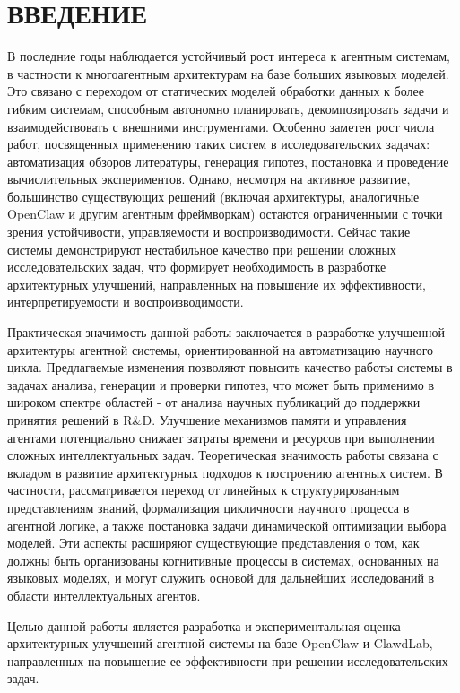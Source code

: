 \chapter*{ВВЕДЕНИЕ}
\sloppy

В последние годы наблюдается устойчивый рост интереса к агентным системам, в частности к многоагентным архитектурам на базе больших языковых моделей. Это связано с переходом от статических моделей обработки данных к более гибким системам, способным автономно планировать, декомпозировать задачи и взаимодействовать с внешними инструментами. Особенно заметен рост числа работ, посвященных применению таких систем в исследовательских задачах: автоматизация обзоров литературы, генерация гипотез, постановка и проведение вычислительных экспериментов. Однако, несмотря на активное развитие, большинство существующих решений (включая архитектуры, аналогичные OpenClaw и другим агентным фреймворкам) остаются ограниченными с точки зрения устойчивости, управляемости и воспроизводимости. Сейчас такие системы демонстрируют нестабильное качество при решении сложных исследовательских задач, что формирует необходимость в разработке архитектурных улучшений, направленных на повышение их эффективности, интерпретируемости и воспроизводимости.

Практическая значимость данной работы заключается в разработке улучшенной архитектуры агентной системы, ориентированной на автоматизацию научного цикла. Предлагаемые изменения позволяют повысить качество работы системы в задачах анализа, генерации и проверки гипотез, что может быть применимо в широком спектре областей - от анализа научных публикаций до поддержки принятия решений в R&D. Улучшение механизмов памяти и управления агентами потенциально снижает затраты времени и ресурсов при выполнении сложных интеллектуальных задач. Теоретическая значимость работы связана с вкладом в развитие архитектурных подходов к построению агентных систем. В частности, рассматривается переход от линейных к структурированным представлениям знаний, формализация цикличности научного процесса в агентной логике, а также постановка задачи динамической оптимизации выбора моделей. Эти аспекты расширяют существующие представления о том, как должны быть организованы когнитивные процессы в системах, основанных на языковых моделях, и могут служить основой для дальнейших исследований в области интеллектуальных агентов.

Целью данной работы является разработка и экспериментальная оценка архитектурных улучшений агентной системы на базе OpenClaw и ClawdLab, направленных на повышение ее эффективности при решении исследовательских задач. 

